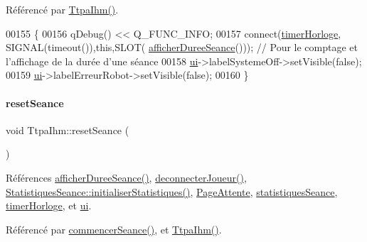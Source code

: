 Référencé par \hyperlink{class_ttpa_ihm_ab3ed4b37a93ff04842414d4a98861d66}{Ttpa\+Ihm()}.


\begin{DoxyCode}
00155 \{
00156     qDebug() << Q\_FUNC\_INFO;
00157     connect(\hyperlink{class_ttpa_ihm_a447ad7262efa01d22bc3222e0e470087}{timerHorloge}, SIGNAL(timeout()),\textcolor{keyword}{this},SLOT(
      \hyperlink{class_ttpa_ihm_a266897eb263e584b40fc2b7c26347623}{afficherDureeSeance}())); \textcolor{comment}{// Pour le comptage et l'affichage de la durée d'une séance}
00158     \hyperlink{class_ttpa_ihm_ad5fae1222a667da158c26f3d0f0dce23}{ui}->labelSystemeOff->setVisible(\textcolor{keyword}{false});
00159     \hyperlink{class_ttpa_ihm_ad5fae1222a667da158c26f3d0f0dce23}{ui}->labelErreurRobot->setVisible(\textcolor{keyword}{false});
00160 \}
\end{DoxyCode}
\mbox{\label{class_ttpa_ihm_a521fea1cb4384157e5422a033e9a4d4f}} 
\paragraph{\texorpdfstring{reset\+Seance}{resetSeance}}
{\footnotesize\ttfamily void Ttpa\+Ihm\+::reset\+Seance (\begin{DoxyParamCaption}{ }\end{DoxyParamCaption})\hspace{0.3cm}{\ttfamily [slot]}}



Références \hyperlink{class_ttpa_ihm_a266897eb263e584b40fc2b7c26347623}{afficher\+Duree\+Seance()}, \hyperlink{class_ttpa_ihm_a86d400f2f250f5d2984c8c36394c2ac2}{deconnecter\+Joueur()}, \hyperlink{class_statistiques_seance_a17e1c49e2986a8490ff96e4bd7733291}{Statistiques\+Seance\+::initialiser\+Statistiques()}, \hyperlink{class_ttpa_ihm_aad886f2c7b90b4f990492092f0be9c2ba94101700630d213692269ca864ff87fe}{Page\+Attente}, \hyperlink{class_ttpa_ihm_abed6897d6f7b4d3a5eb8dcc07651e740}{statistiques\+Seance}, \hyperlink{class_ttpa_ihm_a447ad7262efa01d22bc3222e0e470087}{timer\+Horloge}, et \hyperlink{class_ttpa_ihm_ad5fae1222a667da158c26f3d0f0dce23}{ui}.



Référencé par \hyperlink{class_ttpa_ihm_a9bf7a4cddbdbf786d781e4d084409068}{commencer\+Seance()}, et \hyperlink{class_ttpa_ihm_ab3ed4b37a93ff04842414d4a98861d66}{Ttpa\+Ihm()}.


